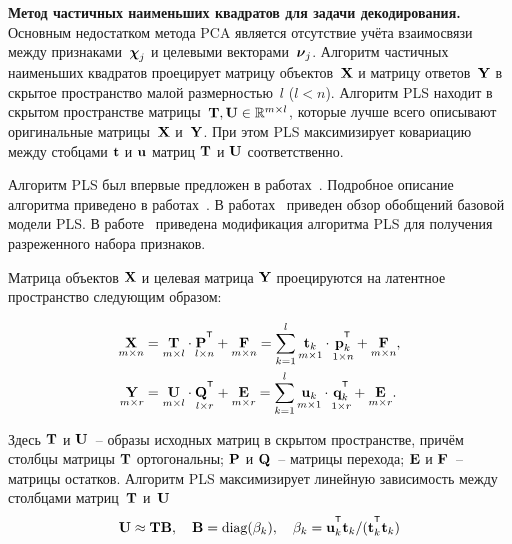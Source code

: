 \vspace{0.5cm}
\textbf{Метод частичных наименьших квадратов для задачи декодирования.}
Основным недостатком метода PCA является отсутствие учёта взаимосвязи между признаками~$\boldsymbol{\chi}_j$ и целевыми векторами~$\boldsymbol{\nu}_j$.
Алгоритм частичных наименьших квадратов проецирует матрицу объектов~$\mathbf{X}$ и матрицу ответов~$\mathbf{Y}$ в скрытое пространство малой размерностью~$l$ ($l < n$).
Алгоритм PLS находит в скрытом пространстве матрицы~$\mathbf{T}, \mathbf{U} \in \mathbb{R}^{m \times l}$, которые лучше всего описывают оригинальные матрицы~$\mathbf{X}$ и~$\mathbf{Y}$. 
При этом PLS максимизирует ковариацию между стобцами $\mathbf{t}$ и $\mathbf{u}$ матриц $\mathbf{T}$ и $\mathbf{U}$ соответственно.

Алгоритм PLS был впервые предложен в работах~\cite{wold1975path,wold1984collinearity,wold1982pls}. Подробное описание алгоритма приведено в работах~\cite{geladi1986partial,geladi1988notes,de1993simpls,vinzi2010handbook,brereton2014partial}.
В работах~\cite{rosipal2005overview,rosipal2011nonlinear} приведен обзор обобщений базовой модели PLS.
В работе~\cite{chun2010sparse} приведена модификация алгоритма PLS для получения разреженного набора признаков. 
 

Матрица объектов $\mathbf{X}$ и целевая матрица $\mathbf{Y}$ проецируются на латентное пространство следующим образом:

\begin{align}
	\label{ch1:eq:PLS_X}
	\underset{m \times n}{\bX} 
	&= \underset{m \times l}{\bT} \cdot \underset{l \times n}{\bP^{\T}} + \underset{m \times n}{\bF} 
	= \sum_{k=1}^l \underset{m \times 1}{\bt_k} \cdot \underset{1 \times n}{\bp_k^{\T}} + \underset{m \times n}{\bF},\\
	\label{ch1:eq:PLS_Y}
	\underset{m \times r}{\bY} 
	&= \underset{m \times l}{\bU} \cdot \underset{l \times r}{\bQ^{\T}} + \underset{m \times r}{\bE}
	=  \sum_{k=1}^l  \underset{m \times 1}{\bu_k} \cdot \underset{1 \times r}{\bq_k^{\T}} +  \underset{m \times r}{\bE}.
\end{align}

Здесь $\mathbf{T}$ и $\mathbf{U}$~-- образы исходных матриц в скрытом пространстве, причём столбцы матрицы $\mathbf{T}$ ортогональны; $\mathbf{P}$ и $\mathbf{Q}$~-- матрицы перехода; $\mathbf{E}$ и $\mathbf{F}$~-- матрицы остатков. 
Алгоритм PLS максимизирует линейную зависимость между столбцами матриц~$\mathbf{T}$ и~$\mathbf{U}$
\begin{equation*}
	\bU \approx \bT \bB, \quad \bB = \text{diag}(\beta_k), \quad \beta_k = \bu_k^{\T}\bt_k / (\bt_k^{\T}\bt_k)
\end{equation*}


